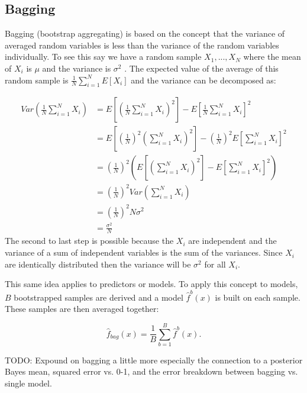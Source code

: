 \subsection{Bagging}

Bagging (bootstrap aggregating) is based on the concept that the variance of averaged random variables is less than the variance of the random variables individually. To see this say we have a random sample $X_1,..., X_N$ where the mean of $X_i$ is $\mu$ and the variance is $\sigma^2$ . The expected value of the average of this random sample is $\frac{1}{N}\sum_{i=1}^N{E[X_i]}$ and the variance can be decomposed as:

\begin{equation}
\begin{split}
Var \left(\frac{1}{N}\sum_{i=1}^N{X_i} \right) &=  E\left[ \left(\frac{1}{N}\sum_{i=1}^N{X_i}\right)^2 \right] - E\left[\frac{1}{N}\sum_{i=1}^N{X_i}\right]^2 \\
&= E\left[ \left(\frac{1}{N}\right)^2 \left(\sum_{i=1}^N{X_i}\right)^2 \right] - \left(\frac{1}{N} \right)^2 E\left[\sum_{i=1}^N{X_i}\right]^2 \\
&= \left(\frac{1}{N} \right)^2 \left( E\left[\left(\sum_{i=1}^N{X_i}\right)^2 \right] - E\left[\sum_{i=1}^N{X_i}\right]^2    \right) \\
&= \left(\frac{1}{N} \right)^2 Var\left(\sum_{i=1}^N{X_i}\right)\\
&= \left(\frac{1}{N} \right)^2 N \sigma^2\\
&= \frac{\sigma^2}{N}
\end{split}
\end{equation}
The second to last step is possible because the $X_i$ are independent and the variance of a sum of independent variables is the sum of the variances. Since $X_i$ are identically distributed then the variance will be $\sigma^2$ for all $X_i$.

This same idea applies to predictors or models. To apply this concept to models, $B$ bootstrapped samples are derived and a model $\hat{f}^b(x)$ is built on each sample. These samples are then averaged together:

\begin{equation}
\hat{f}_{bag}(x) = \frac{1}{B} \sum_{b=1}^B{\hat{f}^b(x)}.
\end{equation}

TODO: Expound on bagging a little more especially the connection to a posterior Bayes mean, squared error vs. 0-1, and the error breakdown between bagging vs. single model.

